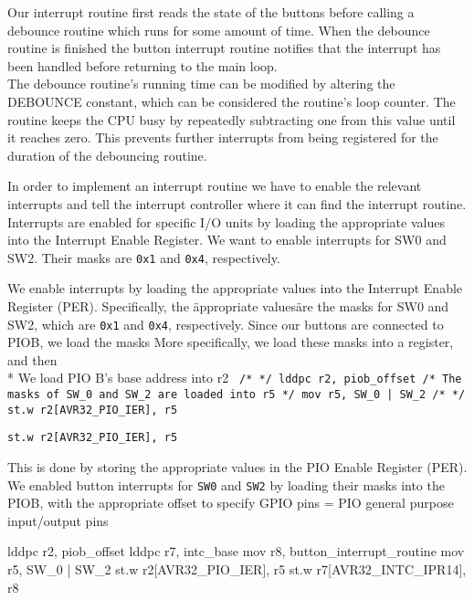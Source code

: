 Our interrupt routine first reads the state of the buttons before calling a debounce routine which runs for some amount of time.
When the debounce routine is finished the button interrupt routine notifies that the interrupt has been handled before returning to the main loop.
\\ %
The debounce routine's running time can be modified by altering the DEBOUNCE constant, which can be considered the routine's loop counter. The routine keeps the CPU busy by repeatedly subtracting one from this value until it reaches zero. This prevents further interrupts from being registered for the duration of the debouncing routine.

In order to implement an interrupt routine we have to enable the relevant interrupts and tell the interrupt controller where it can find the interrupt routine.
Interrupts are enabled for specific I/O units by loading the appropriate values into the Interrupt Enable Register.
We want to enable interrupts for SW0 and SW2.
Their masks are \texttt{0x1} and \texttt{0x4}, respectively.


We enable interrupts by loading the appropriate values into the Interrupt Enable Register (PER).
Specifically, the \"appropriate values\" are the masks for SW0 and SW2, which are \texttt{0x1} and \texttt{0x4}, respectively.
Since our buttons are connected to PIOB, we load the masks
More specifically, we load these masks into a register, and then 
\\*
We load PIO B's base address into r2
\texttt{
		/* */
		lddpc r2, piob_offset
		/* The masks of SW_0 and SW_2 are loaded into r5 */
		mov r5, SW_0 | SW_2
		/* */
		st.w r2[AVR32_PIO_IER], r5
}

\texttt{st.w r2[AVR32_PIO_IER], r5 }

This is done by storing the appropriate values in the PIO Enable Register (PER).
We enabled button interrupts for \texttt{SW0} and \texttt{SW2} by loading their masks into the PIOB, with the appropriate offset to specify
GPIO pins = PIO
general purpose input/output pins

lddpc r2, piob_offset
lddpc r7, intc_base
mov r8, button_interrupt_routine
mov r5, SW_0 | SW_2
st.w r2[AVR32_PIO_IER], r5 
st.w r7[AVR32_INTC_IPR14], r8

